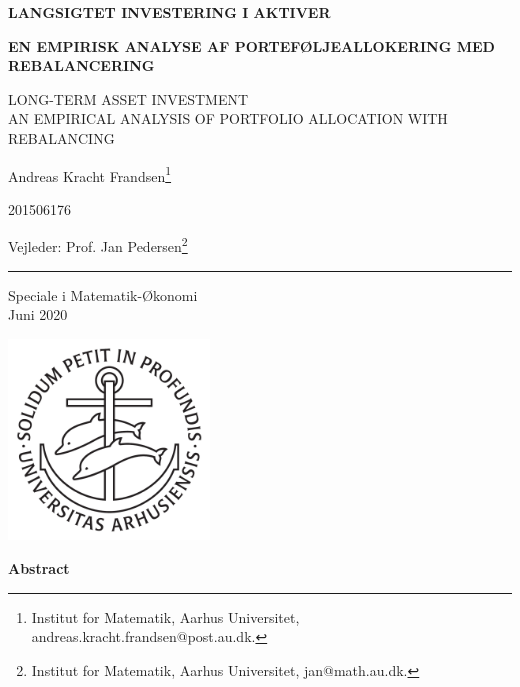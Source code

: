\documentclass[
  a4paper,
  oneside]{memoir}
\author{}
\date{\vspace{-2.5em}}
\begin{document}
\begin{titlingpage}
\begin{center}
\vspace*{0.2cm}

\LARGE \textbf{LANGSIGTET INVESTERING I AKTIVER}

\vspace{3mm}

\renewcommand{\thefootnote}{\fnsymbol{footnote}}
\large \textbf{EN EMPIRISK ANALYSE AF PORTEFØLJEALLOKERING MED REBALANCERING}

\tiny LONG-TERM ASSET INVESTMENT\\ AN EMPIRICAL ANALYSIS OF PORTFOLIO ALLOCATION WITH REBALANCING

\vspace{2mm}

\Large Andreas Kracht Frandsen\footnote{Institut for Matematik, Aarhus Universitet, andreas.kracht.frandsen@post.au.dk.}

\Large 201506176

\Large Vejleder: Prof. Jan Pedersen\footnote{Institut for Matematik, Aarhus Universitet, jan@math.au.dk.}

\vspace{2mm}

\rule{1cm}{0.4pt}

\vspace{2mm}

Speciale i Matematik-Økonomi\\
Juni 2020

\vfill

\includegraphics[width=0.4\textwidth]{latex/ausegl_sort.pdf}

\vfill

\textbf{Abstract}
\end{center}
\begin{center}
\begin{minipage}{15cm}
\lipsum[1-2]
\end{minipage}
\end{center}
\end{titlingpage}
\end{document}
